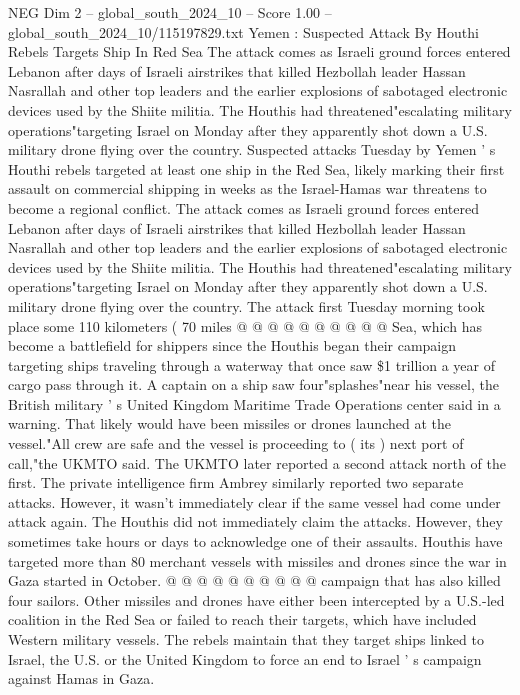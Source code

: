 \begin{textsample}{NEG Dim 2 – global\_south\_2024\_10 – Score 1.00 – global\_south\_2024\_10/115197829.txt}  \label{ex:f2_neg_310}
Yemen : Suspected Attack By Houthi Rebels Targets Ship In Red Sea The attack comes as Israeli ground forces entered Lebanon after days of Israeli airstrikes that killed Hezbollah leader Hassan Nasrallah and other top leaders and the earlier explosions of sabotaged electronic devices used by the Shiite militia.
The Houthis had threatened"escalating military operations"targeting Israel on Monday after they apparently shot down a U.S. military drone flying over the country.
Suspected attacks Tuesday by Yemen ' s Houthi rebels targeted at least one ship in the Red Sea, likely marking their first assault on commercial shipping in weeks as the Israel-Hamas war threatens to become a regional conflict.
The attack comes as Israeli ground forces entered Lebanon after days of Israeli airstrikes that killed Hezbollah leader Hassan Nasrallah and other top leaders and the earlier explosions of sabotaged electronic devices used by the Shiite militia.
The Houthis had threatened"escalating military operations"targeting Israel on Monday after they apparently shot down a U.S. military drone flying over the country.
The attack first Tuesday morning took place some 110 kilometers ( 70 miles @ @ @ @ @ @ @ @ @ @ Sea, which has become a battlefield for shippers since the Houthis began their campaign targeting ships traveling through a waterway that once saw \$1 trillion a year of cargo pass through it.
A captain on a ship saw four"splashes"near his vessel, the British military ' s United Kingdom Maritime Trade Operations center said in a warning.
That likely would have been missiles or drones launched at the vessel."All crew are safe and the vessel is proceeding to ( its ) next port of call,"the UKMTO said.
The UKMTO later reported a second attack north of the first.
The private intelligence firm Ambrey similarly reported two separate attacks.
However, it wasn't immediately clear if the same vessel had come under attack again.
The Houthis did not immediately claim the attacks.
However, they sometimes take hours or days to acknowledge one of their assaults.
Houthis have targeted more than 80 merchant vessels with missiles and drones since the war in Gaza started in October. @ @ @ @ @ @ @ @ @ @ campaign that has also killed four sailors.
Other missiles and drones have either been intercepted by a U.S.-led coalition in the Red Sea or failed to reach their targets, which have included Western military vessels.
The rebels maintain that they target ships linked to Israel, the U.S. or the United Kingdom to force an end to Israel ' s campaign against Hamas in Gaza.

\end{textsample}
